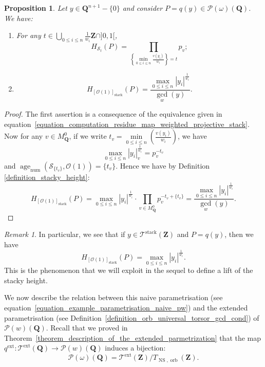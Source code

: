 \documentclass{proc-l}
\newcommand{\Z}{\mathbf{Z}}
\newcommand{\Q}{\mathbf{Q}}
\DeclareMathOperator{\stack}{stack}
\DeclareMathOperator{\num}{num}
\DeclareMathOperator{\age}{age}
\DeclareMathOperator{\NS}{NS}
\DeclareMathOperator{\orb}{orb}
\DeclareMathOperator{\ext}{ext}
\newcommand{\stackS}{\mathcal{S}}
\newcommand{\stackT}{\mathcal{T}}
\newcommand{\stackP}{\mathcal{P}}
\newcommand{\sheafO}{\mathcal{O}}
\newcommand{\w}{\omega}
\newtheorem{prop}[theorem]{Proposition}
\theoremstyle{definition}
\theoremstyle{remark}
\newtheorem{remark}[theorem]{Remark}
\numberwithin{equation}{section}
\begin{document}
\begin{prop}\label{proposition_height_weighted_projective_stack}
    Let $y \in \Q^{n + 1}-\{0\}$ and consider $P = q(y) \in \stackP(\w)(\Q)$. We have:
    \begin{enumerate}
        \item For any $t \in \bigcup\limits_{0 \leqslant i \leqslant n} \frac{1}{w_i} \Z \cap ]0,1[$, $$H_{\stackS_t}(P) = \prod\limits_{\left\{ \min\limits_{0 \leqslant i \leqslant n} \frac{v(y_i)}{w_i} \right\} = t} p_v ;$$
        \item $$H_{[\sheafO(1)]_{\stack}}(P) = \frac{\max\limits_{0 \leqslant i \leqslant n }|y_i|^{\frac{1}{w_i}}}{\gcd_w(y)} .$$
    \end{enumerate}
\end{prop}

\begin{proof}
The first assertion is a consequence of the equivalence given in equation~\eqref{equation_computation_residue_map_weighted_projective_stack}. Now for any $v \in M_{\Q}^0$, if we write $t_v = \min\limits_{0 \leqslant i \leqslant n} \left( \frac{v(y_i)}{w_i} \right)$, we have $$\max\limits_{0 \leqslant i \leqslant n }|y_i|_v^{\frac{1}{w_i}} = p_v^{-t_v}$$and $\age_{\num}\left({\stackS_{\{t_v\}}},\sheafO(1)\right) = \{t_v\}$. Hence we have by Definition \ref{definition_stacky_height}:
    $$
H_{[\sheafO(1)]_{\stack}}(P)
=
\max\limits_{0 \leqslant i \leqslant n} |y_i|^{\frac{1}{w_i}}
\cdot
\prod\limits_{v \in M_{\Q}^0} p_v^{-t_v + \{t_v\}}
=
\frac{\max\limits_{0 \leqslant i \leqslant n} |y_i|^{\frac{1}{w_i}}}{\gcd_w(y)}.
$$
\end{proof}

\begin{remark}\label{remark_computation_weighted_stack_height}
    In particular, we see that if $y \in \stackT^{\stack}(\Z)$ and $P = q(y)$, then we have
$$
H_{[\sheafO(1)]_{\stack}}(P) = \max\limits_{0 \leqslant i \leqslant n }|y_i|^{\frac{1}{w_i}}.
$$This is the phenomenon that we will exploit in the sequel to define a lift of the stacky height.
\end{remark}

We now describe the relation between this naive parametrisation (see equation~\ref{equation_example_parametrisation_naive_pw}) and the extended parametrisation (see Definition~\ref{definition_orb_universal_torsor_gcd_cond}) of $\stackP(w)(\Q)$. Recall that we proved in Theorem~\ref{theorem_description_of_the_extended_parmetrization} that the map $q^{\ext} : \stackT^{\ext}(\Q) \rightarrow \stackP(w)(\Q)$ induces a bijection:
$$
\stackP(\w)(\Q) = \stackT^{\ext}(\Z) / T_{\NS,\orb}(\Z).
$$
\end{document}

